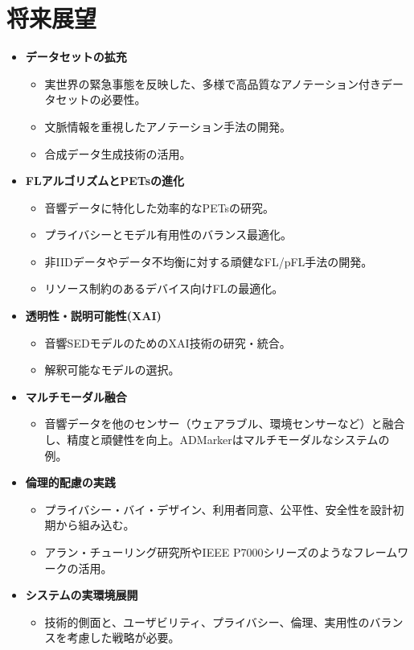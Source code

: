 \documentclass[unicode,12pt,aspectratio=169, dvipdfmx]{beamer}
\begin{document}
\section{将来展望}
\begin{frame}{\insertsectionhead}
    \begin{itemize}
        \item \textbf{データセットの拡充}
        \begin{itemize}
            \item 実世界の緊急事態を反映した、多様で高品質なアノテーション付きデータセットの必要性。
            \item 文脈情報を重視したアノテーション手法の開発。
            \item 合成データ生成技術の活用。
        \end{itemize}
        \item \textbf{FLアルゴリズムとPETsの進化}
        \begin{itemize}
            \item 音響データに特化した効率的なPETsの研究。
            \item プライバシーとモデル有用性のバランス最適化。
            \item 非IIDデータやデータ不均衡に対する頑健なFL/pFL手法の開発。
            \item リソース制約のあるデバイス向けFLの最適化。
        \end{itemize}
        \item \textbf{透明性・説明可能性(XAI)}
        \begin{itemize}
            \item 音響SEDモデルのためのXAI技術の研究・統合。
            \item 解釈可能なモデルの選択。
        \end{itemize}
        \item \textbf{マルチモーダル融合}
        \begin{itemize}
            \item 音響データを他のセンサー（ウェアラブル、環境センサーなど）と融合し、精度と頑健性を向上。ADMarkerはマルチモーダルなシステムの例。
        \end{itemize}
        \item \textbf{倫理的配慮の実践}
        \begin{itemize}
            \item プライバシー・バイ・デザイン、利用者同意、公平性、安全性を設計初期から組み込む。
            \item アラン・チューリング研究所やIEEE P7000シリーズのようなフレームワークの活用。
        \end{itemize}
        \item \textbf{システムの実環境展開}
        \begin{itemize}
            \item 技術的側面と、ユーザビリティ、プライバシー、倫理、実用性のバランスを考慮した戦略が必要。
        \end{itemize}
    \end{itemize}
\end{frame}
\end{document}

